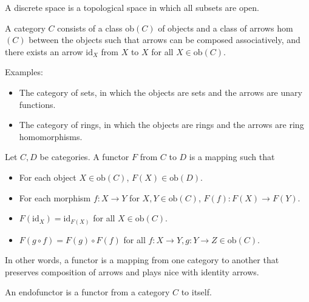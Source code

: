 \documentclass[12pt]{article}
\begin{document}
\medskip
{}

    A discrete space is a topological space in which all subsets are open.

\medskip
{}

    A category $C$ consists of a class ob$(C)$ of objects and a class of arrows hom$(C)$ between the objects such that arrows can be composed associatively, and there exists an arrow $\text{id}_X$ from $X$ to $X$ for all $X \in \text{ob}(C)$.

    Examples:
    \begin{itemize}
        \item The category of sets, in which the objects are sets and the arrows are unary functions.
        \item The category of rings, in which the objects are rings and the arrows are ring homomorphisms.
    \end{itemize}

\medskip
{}

    Let $C, D$ be categories. A functor $F$ from $C$ to $D$ is a mapping such that
    \begin{itemize}
        \item For each object $X \in \text{ob}(C)$, $F(X) \in \text{ob}(D)$.
        \item For each morphism $f: X \to Y$ for $X,Y \in \text{ob}(C)$, $F(f) : F(X) \to F(Y)$.
        \item $F(\text{id}_X) = \text{id}_{F(X)}$ for all $X \in \text{ob}(C)$.
        \item $F(g \circ f) = F(g) \circ F(f)$ for all $f : X \to Y, g : Y \to Z \in \text{ob}(C)$.
    \end{itemize}

    In other words, a functor is a mapping from one category to another that preserves composition of arrows and plays nice with identity arrows.

\medskip
{}

    An endofunctor is a functor from a category $C$ to itself.
\end{document}
